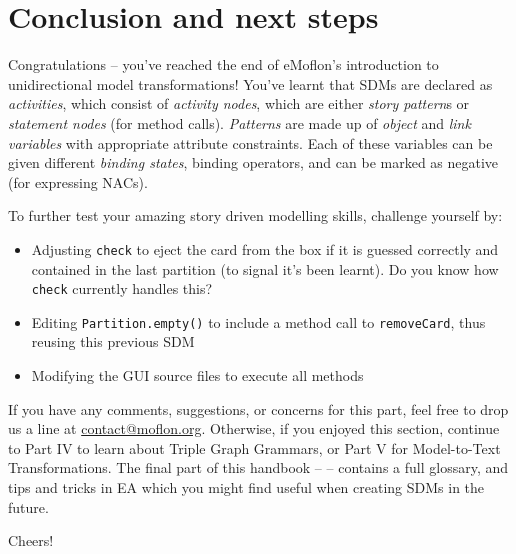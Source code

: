 \genHeader
\section{Conclusion and next steps}

\vspace{0.5cm}

Congratulations -- you've reached the end of eMoflon's introduction to unidirectional model transformations! You've learnt that SDMs are declared as
\emph{activities}, which consist of \emph{activity nodes}, which are either \emph{story pattern}s or \emph{statement nodes} (for method calls).
\emph{Patterns} are made up of \emph{object} and \emph{link variables} with appropriate attribute constraints. Each of these variables can be given
different \emph{binding states}, binding operators, and can be marked as negative (for expressing NACs).

\vspace{0.5cm}

To further test your amazing story driven modelling skills, challenge yourself by:
\begin{itemize}
\item Adjusting \texttt{check} to eject the card from the box if it is guessed correctly and contained in the last partition (to signal it's been learnt). Do
you know how \texttt{check} currently handles this?
\item Editing \texttt{Partition.empty()} to include a method call to \texttt{removeCard}, thus reusing this previous SDM
\item Modifying the GUI source files to execute all methods
\end{itemize}

\vspace{0.5cm}
	
If you have any comments, suggestions, or concerns for this part, feel free to drop us a line at \href{mailto:contact@moflon.org}{contact@moflon.org}.
Otherwise, if you enjoyed this section, continue to Part IV to learn about Triple Graph Grammars, or Part V for Model-to-Text Transformations.
The final part of this handbook --  -- contains a full glossary, and tips and tricks in EA which you might find useful when creating SDMs in the future.

Cheers!
